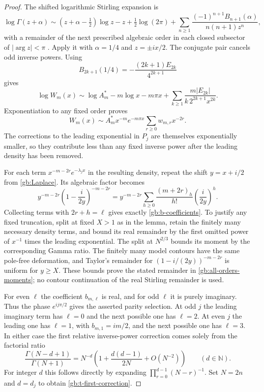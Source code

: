 \begin{proof}
The shifted logarithmic Stirling expansion is
\[
 \log\Gamma(z+\alpha)\sim
 (z+\alpha-\tfrac12)\log z-z+\tfrac12\log(2\pi)
 +\sum_{n\ge1}\frac{(-1)^{n+1}B_{n+1}(\alpha)}{n(n+1)z^n},
\]
with a remainder of the next prescribed algebraic order in each
closed subsector of $|\arg z|<\pi$ \cite{dlmf-stirling}.
Apply it with $\alpha=1/4$ and $z=\pm ix/2$.
The conjugate pair cancels odd inverse powers.  Using
\[
 B_{2k+1}(1/4)=-\frac{(2k+1)E_{2k}}{4^{2k+1}}
\]
gives
\[
 \log W_m(x)\sim
 \log A_m^*-m\log x-m\pi x
       +\sum_{k\ge1}\frac{m|E_{2k}|}{k\,2^{2k+1}x^{2k}}.
\]
Exponentiation to any fixed order proves
\begin{equation}\label{gb:W-all-orders}
 W_m(x)\sim A_m^*x^{-m}e^{-m\pi x}
                       \sum_{r\ge0}w_{m,r}x^{-2r}.
\end{equation}
The corrections to the leading exponential in $P_j$ are themselves
exponentially smaller, so they contribute less than any fixed
inverse power after the leading density has been removed.

For each term $x^{-m-2r}e^{-\lambda_jx}$ in the resulting density,
repeat the shift $y=x+i/2$ from \cref{gb:Laplace}.  Its algebraic
factor becomes
\[
 y^{-m-2r}\left(1-\frac{i}{2y}\right)^{-m-2r}
   =y^{-m-2r}\sum_{h\ge0}
       \frac{(m+2r)_h}{h!}\left(\frac{i}{2y}\right)^h.
\]
Collecting terms with $2r+h=\ell$ gives exactly
\eqref{gb:b-coefficients}.  To justify any fixed truncation, split
at fixed $X>1$ as in the lemma, retain the finitely many necessary
density terms, and bound its real remainder by the first omitted
power of $x^{-1}$ times the leading exponential.  The split at
$N^{2/3}$ bounds its moment by the corresponding Gamma ratio.
The finitely many model contours have the same pole-free deformation,
and Taylor's remainder for $(1-i/(2y))^{-m-2r}$ is uniform for
$y\ge X$.  These bounds prove the stated remainder in
\eqref{gb:all-orders-moments}; no contour continuation of the real
Stirling remainder is used.

For even $\ell$ the coefficient $b_{m,\ell}$ is real, and for
odd $\ell$ it is purely imaginary.  Thus the phase
$e^{ij\pi/2}$ gives the asserted parity selection.  At odd $j$
the leading imaginary term has $\ell=0$ and the next possible
one has $\ell=2$.  At even $j$ the leading one has $\ell=1$,
with $b_{m,1}=im/2$, and the next possible one has $\ell=3$.
In either case the first relative inverse-power correction comes
solely from the factorial ratio
\[
 \frac{\Gamma(N-d+1)}{\Gamma(N+1)}
 =N^{-d}\left(1+\frac{d(d-1)}{2N}+O(N^{-2})\right)
 \qquad(d\in\mathbb N).
\]
For integer $d$ this follows directly by expanding
$\prod_{r=0}^{d-1}(N-r)^{-1}$.  Set $N=2n$ and $d=d_j$
to obtain \eqref{gb:t-first-correction}.
\end{proof}

